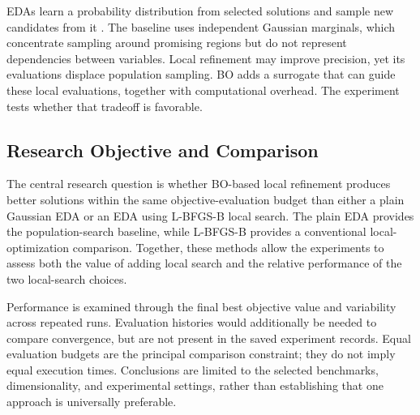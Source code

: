 EDAs learn a probability distribution from selected solutions and sample new candidates from it \cite{larranaga2002eda}. The baseline uses independent Gaussian marginals, which concentrate sampling around promising regions but do not represent dependencies between variables. Local refinement may improve precision, yet its evaluations displace population sampling. BO adds a surrogate that can guide these local evaluations, together with computational overhead. The experiment tests whether that tradeoff is favorable.

\subsection{Research Objective and Comparison}

The central research question is whether BO-based local refinement produces
better solutions within the same objective-evaluation budget than either a
plain Gaussian EDA or an EDA using L-BFGS-B local search. The plain EDA
provides the population-search baseline, while L-BFGS-B provides a
conventional local-optimization comparison. Together, these methods allow
the experiments to assess both the value of adding local search and the
relative performance of the two local-search choices.

Performance is examined through the final best objective value and variability
across repeated runs. Evaluation histories would additionally be needed to
compare convergence, but are not present in the saved experiment records. Equal evaluation budgets are the principal comparison
constraint; they do not imply equal execution times. Conclusions are limited
to the selected benchmarks, dimensionality, and experimental settings,
rather than establishing that one approach is universally preferable.
